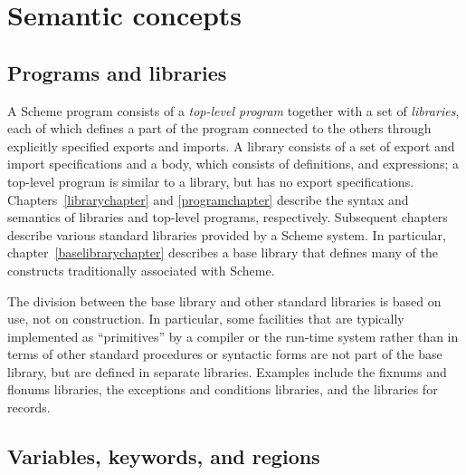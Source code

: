 \chapter{Semantic concepts}
\label{basicchapter}

\section{Programs and libraries}

A Scheme program consists of a \textit{top-level program}
together with a set of \textit{libraries}, each
of which defines a part of the program connected to the others through
explicitly specified exports and imports.  A library consists of a set
of export and import specifications and a body, which consists of
definitions, and expressions;
a top-level program is similar to a library, but
has no export specifications.
Chapters~\ref{librarychapter} and \ref{programchapter}
describe the syntax and semantics of libraries and top-level programs,
respectively.  Subsequent chapters
describe various standard libraries provided by a Scheme system.  In
particular, chapter~\ref{baselibrarychapter} describes a base
library that defines many of the constructs traditionally associated with
Scheme.

The division between the base library and other standard libraries is
based on use, not on construction.  In particular, some facilities
that are typically implemented as ``primitives'' by a compiler or the
run-time system rather than in terms of other standard procedures
 or syntactic forms are not part of the base library, but are defined in
separate libraries.  Examples include the fixnums and flonums libraries,
the exceptions and conditions libraries, and the libraries for
records.

\section{Variables, keywords, and regions}
\label{specialformsection}
\label{variablesection}

